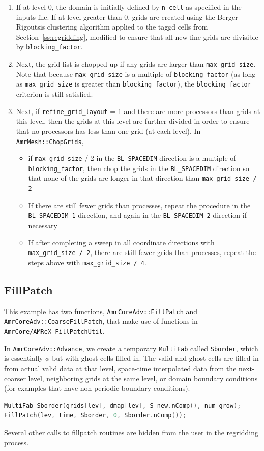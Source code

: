\begin{enumerate}
\item If at level 0, the domain is initially defined by {\tt n\_cell} 
as specified in the inputs file.  If at level greater than 0, 
grids are created using the Berger-Rigoutsis clustering algorithm applied to the
taggd cells from Section~\ref{ss:regridding}, modified to ensure that 
all new fine grids are divisible by {\tt blocking\_factor}.

\item Next, the grid list is chopped up if any grids are larger than {\tt max\_grid\_size}.
Note that because {\tt max\_grid\_size} is a multiple of {\tt blocking\_factor}
(as long as {\tt max\_grid\_size} is greater than {\tt blocking\_factor}),
the {\tt blocking\_factor} criterion is still satisfied.

\item Next, if {\tt refine\_grid\_layout} = 1 and there are more processors than grids
at this level, then the grids at this level are further divided in order to ensure that 
no processors has less than one grid (at each level).  
In {\tt AmrMesh::ChopGrids}, 

\begin{itemize}
\item if {\tt max\_grid\_size} / 2 in the {\tt BL\_SPACEDIM} direction is a multiple of 
{\tt blocking\_factor}, then chop the grids in the {\tt BL\_SPACEDIM} direction
so that none of the grids are longer in that direction than {\tt max\_grid\_size / 2} 
\item If there are still fewer grids than processes, repeat the procedure in the 
{\tt BL\_SPACEDIM-1} direction, and again in the {\tt BL\_SPACEDIM-2} direction if necessary
\item If after completing a sweep in all coordinate directions with  {\tt max\_grid\_size / 2},
there are still fewer grids than processes, repeat the steps above with  {\tt max\_grid\_size / 4}.
\end{itemize}

\end{enumerate}

\subsection{FillPatch}
This example has two functions, {\tt AmrCoreAdv::FillPatch} and {\tt AmrCoreAdv::CoarseFillPatch},
that make use of functions in {\tt AmrCore/AMReX\_FillPatchUtil}.

In {\tt AmrCoreAdv::Advance}, we create a temporary {\tt MultiFab} called {\tt Sborder}, which
is essentially $\phi$ but with ghost cells filled in.  The valid and ghost cells are filled in from
actual valid data at that level, space-time interpolated data from the next-coarser level, 
neighboring grids at the same level, or domain boundary conditions 
(for examples that have non-periodic boundary conditions).
\begin{lstlisting}[language=cpp]
MultiFab Sborder(grids[lev], dmap[lev], S_new.nComp(), num_grow);
FillPatch(lev, time, Sborder, 0, Sborder.nComp());
\end{lstlisting}
Several other calls to fillpatch routines are hidden from the user in the regridding process.
